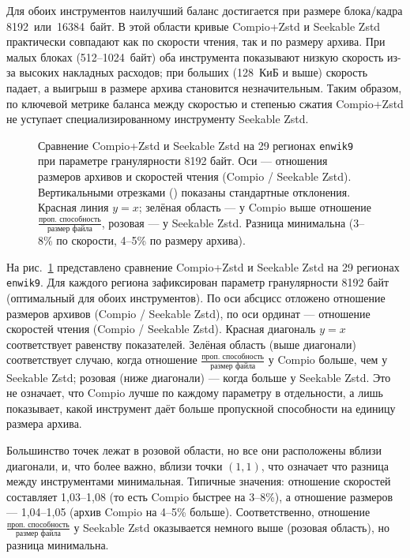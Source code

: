 Для обоих инструментов наилучший баланс достигается при размере блока/кадра 8192~или~16384~байт. В этой области кривые Compio+Zstd и Seekable Zstd практически совпадают как по скорости чтения, так и по размеру архива. При малых блоках (512--1024~байт) оба инструмента показывают низкую скорость из-за высоких накладных расходов; при больших (128~КиБ и выше) скорость падает, а выигрыш в размере архива становится незначительным. Таким образом, по ключевой метрике баланса между скоростью и степенью сжатия Compio+Zstd не уступает специализированному инструменту Seekable Zstd.

\begin{figure}[h]
    \centering
    
    \caption{Сравнение Compio+Zstd и Seekable Zstd на 29 регионах \texttt{enwik9} при параметре гранулярности 8192 байт. Оси --- отношения размеров архивов и скоростей чтения (Compio / Seekable Zstd). Вертикальными отрезками () показаны стандартные отклонения. Красная линия $y=x$; зелёная область --- у Compio выше отношение $\frac{\text{проп. способность}}{\text{размер файла}}$, розовая --- у Seekable Zstd. Разница минимальна (3--8\% по скорости, 4--5\% по размеру архива).}
    \label{fig:alternatives-3}
\end{figure}

На рис.~\ref{fig:alternatives-3} представлено сравнение Compio+Zstd и Seekable Zstd на 29 регионах \texttt{enwik9}. Для каждого региона зафиксирован параметр гранулярности 8192 байт (оптимальный для обоих инструментов). По оси абсцисс отложено отношение размеров архивов (Compio / Seekable Zstd), по оси ординат --- отношение скоростей чтения (Compio / Seekable Zstd). Красная диагональ $y=x$ соответствует равенству показателей. Зелёная область (выше диагонали) соответствует случаю, когда отношение $\frac{\text{проп. способность}}{\text{размер файла}}$ у Compio больше, чем у Seekable Zstd; розовая (ниже диагонали) --- когда больше у Seekable Zstd. Это не означает, что Compio лучше по каждому параметру в отдельности, а лишь показывает, какой инструмент даёт больше пропускной способности на единицу размера архива.

Большинство точек лежат в розовой области, но все они расположены вблизи диагонали, и, что более важно, вблизи точки $(1, 1)$, что означает что разница между инструментами минимальная. Типичные значения: отношение скоростей составляет 1,03--1,08 (то есть Compio быстрее на 3--8\%), а отношение размеров --- 1,04--1,05 (архив Compio на 4--5\% больше). Соответственно, отношение $\frac{\text{проп. способность}}{\text{размер файла}}$ у Seekable Zstd оказывается немного выше (розовая область), но разница минимальна.


